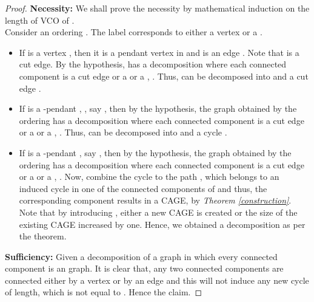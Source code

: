 \documentclass[runningheads]{llncs}
\begin{document}
\begin{proof}
\textbf{Necessity:} We shall prove the necessity by mathematical induction on the length  of VCO of .\\
\noindent Consider an ordering . The label  corresponds to either a vertex or a . 
\begin{itemize}
\item[] 
If  is a vertex , then it is a pendant vertex in  and  is an edge . Note that  is a cut edge. By the hypothesis,  has a decomposition  where each connected component is a cut edge or a  or a , . Thus,  can be decomposed into  and a cut edge .

\item[] 
If  is a -pendant , , say , then by the hypothesis, the graph obtained by the ordering  has a decomposition  where each connected component is a cut edge or a  or a , . Thus,  can be decomposed into  and a cycle .

\item[] 
If  is a -pendant , say , then by the hypothesis, the graph obtained by the ordering  has a decomposition  where each connected component is a cut edge or a  or a , . Now, combine the cycle  to the path , which belongs to an induced cycle  in one of the connected components of  and thus, the corresponding component results in a CAGE, by \emph{Theorem \ref{construction}}. Note that by introducing , either a new CAGE is created or the size of the existing CAGE increased by one. Hence, we obtained a decomposition as per the theorem.

\end{itemize}

\noindent \textbf{Sufficiency:} Given a decomposition of a graph in which every connected component is an  graph. It is clear that, any two connected components are connected either by a vertex or by an edge and this will not induce any new cycle of length, which is not equal to . Hence the claim. 
\end{proof}
\end{document}
